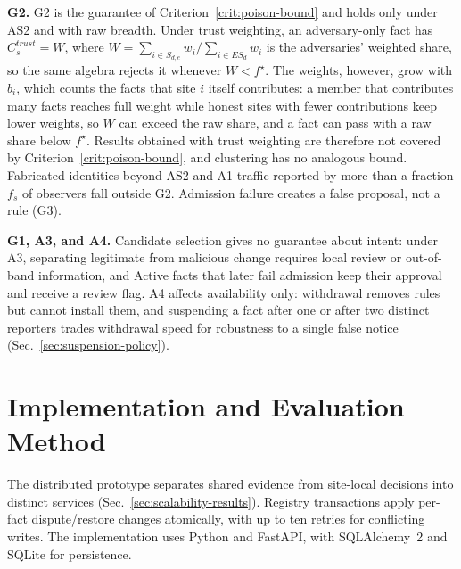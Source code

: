 \documentclass[journal]{IEEEtran}
\theoremstyle{definition}
\begin{document}
\textbf{G2.} G2 is the guarantee of Criterion~\ref{crit:poison-bound} and holds only under AS2 and with raw breadth. Under trust weighting, an adversary-only fact has $C_s^{trust}=W$, where $W=\sum_{i\in S_{d,e}}w_i/\sum_{i\in ES_d}w_i$ is the adversaries' weighted share, so the same algebra rejects it whenever $W<f^\star$. The weights, however, grow with $b_i$, which counts the facts that site $i$ itself contributes: a member that contributes many facts reaches full weight while honest sites with fewer contributions keep lower weights, so $W$ can exceed the raw share, and a fact can pass with a raw share below $f^\star$. Results obtained with trust weighting are therefore not covered by Criterion~\ref{crit:poison-bound}, and clustering has no analogous bound. Fabricated identities beyond AS2 and A1 traffic reported by more than a fraction $f_s$ of observers fall outside G2. Admission failure creates a false proposal, not a rule (G3).

\textbf{G1, A3, and A4.} Candidate selection gives no guarantee about intent: under A3, separating legitimate from malicious change requires local review or out-of-band information, and Active facts that later fail admission keep their approval and receive a review flag. A4 affects availability only: withdrawal removes rules but cannot install them, and suspending a fact after one or after two distinct reporters trades withdrawal speed for robustness to a single false notice (Sec.~\ref{sec:suspension-policy}).



\section{Implementation and Evaluation Method}
\label{sec:impl}
The distributed prototype separates shared evidence from site-local decisions into distinct services (Sec.~\ref{sec:scalability-results}). Registry transactions apply per-fact dispute/restore changes atomically, with up to ten retries for conflicting writes. The implementation uses Python and FastAPI, with SQLAlchemy~2 and SQLite for persistence.
\end{document}
